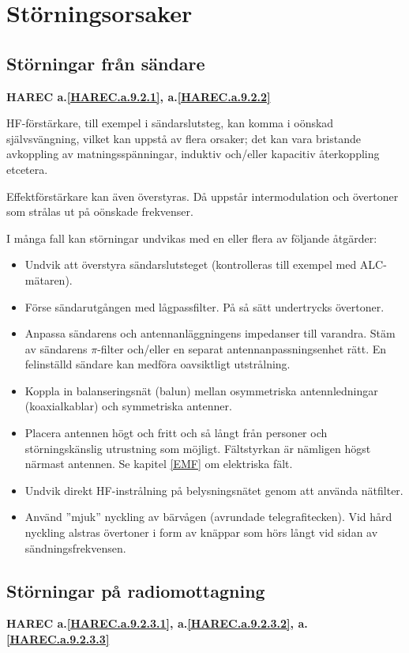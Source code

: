 \section{Störningsorsaker}

\subsection{Störningar från sändare}
\textbf{
HAREC a.\ref{HAREC.a.9.2.1}\label{myHAREC.a.9.2.1},
 a.\ref{HAREC.a.9.2.2}\label{myHAREC.a.9.2.2}
}

HF-förstärkare, till exempel i sändarslutsteg, kan komma i oönskad självsvängning,
vilket kan uppstå av flera orsaker; det kan vara bristande avkoppling av
matningsspänningar, induktiv och/eller kapacitiv återkoppling etcetera.

Effektförstärkare kan även överstyras.
Då uppstår intermodulation och övertoner som strålas ut på oönskade frekvenser.

I många fall kan störningar undvikas med en eller flera av följande åtgärder:
\begin{itemize}
\item Undvik att överstyra sändarslutsteget (kontrolleras till exempel med
  ALC-mätaren).
\item Förse sändarutgången med lågpassfilter.
  På så sätt undertrycks övertoner.
\item Anpassa sändarens och antennanläggningens impedanser till varandra.
  Stäm av sändarens \(\pi\)-filter och/eller en separat antennanpassningsenhet
  rätt.
  En felinställd sändare kan medföra oavsiktligt utstrålning.
\item Koppla in balanseringsnät (balun) mellan osymmetriska antennledningar
  (koaxialkablar) och symmetriska antenner.
\item Placera antennen högt och fritt och så långt från personer och
  störningskänslig utrustning som möjligt.
  Fältstyrkan är nämligen högst närmast antennen.
  Se kapitel \ref{EMF} om elektriska fält.
\item Undvik direkt HF-instrålning på belysningsnätet genom att använda
  nätfilter.
\item Använd ''mjuk'' nyckling av bärvågen (avrundade telegrafitecken).
  Vid hård nyckling alstras övertoner i form av knäppar som hörs långt vid
  sidan av sändningsfrekvensen.
\end{itemize}

\subsection{Störningar på radiomottagning}
\textbf{
HAREC a.\ref{HAREC.a.9.2.3.1}\label{myHAREC.a.9.2.3.1},
 a.\ref{HAREC.a.9.2.3.2}\label{myHAREC.a.9.2.3.2},
 a.\ref{HAREC.a.9.2.3.3}\label{myHAREC.a.9.2.3.3}
}

